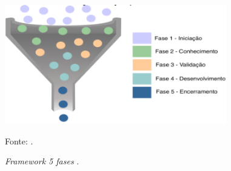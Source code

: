 \documentclass[
	12pt,				%
	openright,			%
	oneside,			%
	a4paper,			%
	english,			%
	french,				%
	spanish,			%
	brazil,				%
	]{abntex2}
\begin{document}
\begin{figure}[ht]
    \centering
    \caption{\textit{Framework 5 fases  }.}
    \includegraphics[width=3.8in]{Images/15Silva2021.png}
    \label{fig: silva21}
    
    \centering \small Fonte: \cite{silva2021w}.
\end{figure}

\pagebreak
\end{document}

